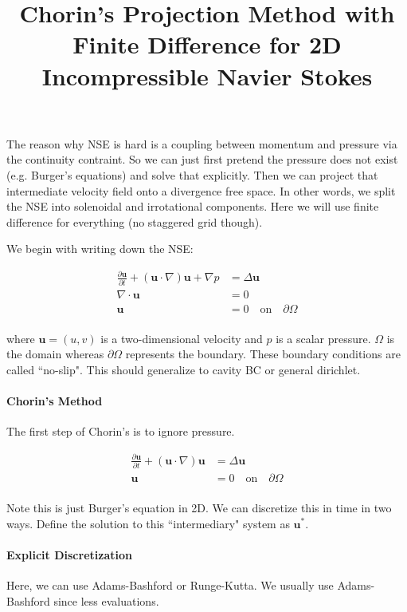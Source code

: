\documentclass[12pt]{article}
\begin{document}
\title{Chorin's Projection Method with Finite Difference for 2D Incompressible Navier Stokes}
\maketitle

The reason why NSE is hard is a coupling between momentum and pressure via the continuity contraint. So we can just first pretend the pressure does not exist (e.g. Burger's equations) and solve that explicitly. Then we can project that intermediate velocity field onto a divergence free space. In other words, we split the NSE into solenoidal and irrotational components. Here we will use finite difference for everything (no staggered grid though).

We begin with writing down the NSE:

\begin{align*}
    \frac{\partial{\mathbf{u}}}{\partial t} + (\mathbf{u} \cdot \nabla)\mathbf{u} + \nabla p &= \Delta \mathbf{u} \\
    \nabla \cdot \mathbf{u} &= 0 \\
    \mathbf{u} &= 0 \quad  \text{on} \quad  \partial \Omega \\
\end{align*}

where $\mathbf{u} = (u,v)$ is a two-dimensional velocity and $p$ is a scalar pressure. $\Omega$ is the domain whereas $\partial \Omega$ represents the boundary. These boundary conditions are called ``no-slip". This should generalize to cavity BC or general dirichlet.

\paragraph{Chorin's Method}
The first step of Chorin's is to ignore pressure.

\begin{align*}
    \frac{\partial{\mathbf{u}}}{\partial t} + (\mathbf{u} \cdot \nabla)\mathbf{u} &= \Delta \mathbf{u} \\
    \mathbf{u} &= 0 \quad  \text{on} \quad  \partial \Omega \\
\end{align*}

Note this is just Burger's equation in 2D. We can discretize this in time in two ways. Define the solution to this ``intermediary" system as $\mathbf{u}^*$.

\paragraph{Explicit Discretization}
Here, we can use Adams-Bashford or Runge-Kutta. We usually use Adams-Bashford since less evaluations.
\end{document}
